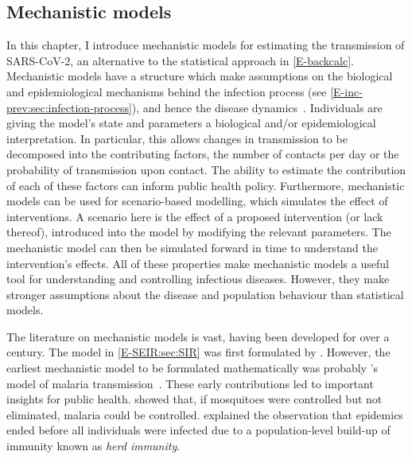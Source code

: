 \documentclass[thesis.tex]{subfiles}
\begin{document}
\subsection{Mechanistic models}

In this chapter, I introduce mechanistic models for estimating the transmission of SARS-CoV-2, an alternative to the statistical approach in \cref{E-backcalc}.
Mechanistic models have a structure which make assumptions on the biological and epidemiological mechanisms behind the infection process (see \cref{E-inc-prev:sec:infection-process}), and hence the disease dynamics~\autocite{lesslerMechanistic}.
Individuals are giving the model's state and parameters a biological and/or epidemiological interpretation.
In particular, this allows changes in transmission to be decomposed into the contributing factors, \eg the number of contacts per day or the probability of transmission upon contact.
The ability to estimate the contribution of each of these factors can inform public health policy.
Furthermore, mechanistic models can be used for scenario-based modelling, which simulates the effect of interventions.
A scenario here is the effect of a proposed intervention (or lack thereof), introduced into the model by modifying the relevant parameters.
The mechanistic model can then be simulated forward in time to understand the intervention's effects.
All of these properties make mechanistic models a useful tool for understanding and controlling infectious diseases.
However, they make stronger assumptions about the disease and population behaviour than statistical models.

The literature on mechanistic models is vast, having been developed for over a century.
The model in \cref{E-SEIR:sec:SIR} was first formulated by \textcite{kermackContribution}.
However, the earliest mechanistic model to be formulated mathematically was probably \textcite{rossMalariaA}'s model of malaria transmission~\autocite{lesslerMechanistic}.
These early contributions led to important insights for public health.
\Textcite{rossMalariaA} showed that, if mosquitoes were controlled but not eliminated, malaria could be controlled.
\Textcite{kermackContribution} explained the observation that epidemics ended before all individuals were infected due to a population-level build-up of immunity known as \emph{herd immunity}.
\end{document}
